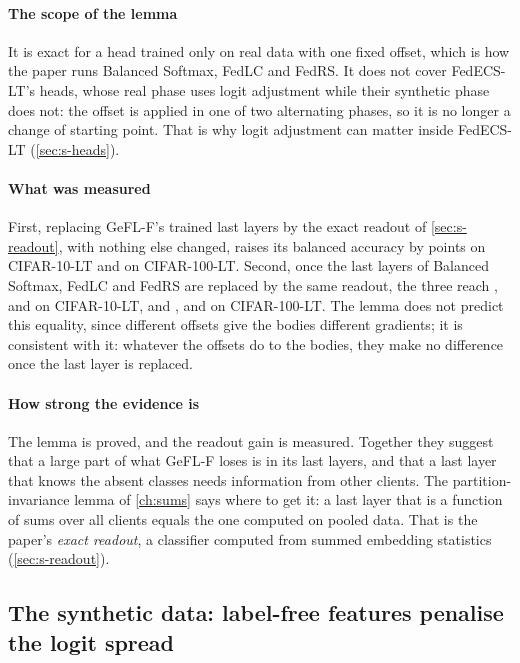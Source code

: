 \paragraph{The scope of the lemma} It is exact for a head trained only on real data with one fixed offset, which is
how the paper runs Balanced Softmax, FedLC and FedRS. It does not cover FedECS-LT's heads, whose real phase uses logit
adjustment while their synthetic phase does not: the offset is applied in one of two alternating phases, so it is no
longer a change of starting point. That is why logit adjustment can matter inside FedECS-LT (\cref{sec:s-heads}).

\paragraph{What was measured} First, replacing GeFL-F's trained last layers by the exact readout of
\cref{sec:s-readout}, with nothing else changed, raises its balanced accuracy by  points
on CIFAR-10-LT and  on CIFAR-100-LT. Second, once the last layers of Balanced Softmax,
FedLC and FedRS are replaced by the same readout, the three reach ,
 and  on CIFAR-10-LT, and
,  and  on
CIFAR-100-LT. The lemma does not predict this equality, since different offsets give the bodies different gradients;
it is consistent with it: whatever the offsets do to the bodies, they make no difference once the last layer is
replaced.

\paragraph{How strong the evidence is} The lemma is proved, and the readout gain is measured. Together they suggest
that a large part of what GeFL-F loses is in its last layers, and that a last layer that knows the absent classes needs
information from other clients. The partition-invariance lemma of \cref{ch:sums} says where to get it: a last layer
that is a function of sums over all clients equals the one computed on pooled data. That is the paper's \emph{exact
readout}, a classifier computed from summed embedding statistics (\cref{sec:s-readout}).

\subsection{The synthetic data: label-free features penalise the logit spread}\label{sec:s-spread}

